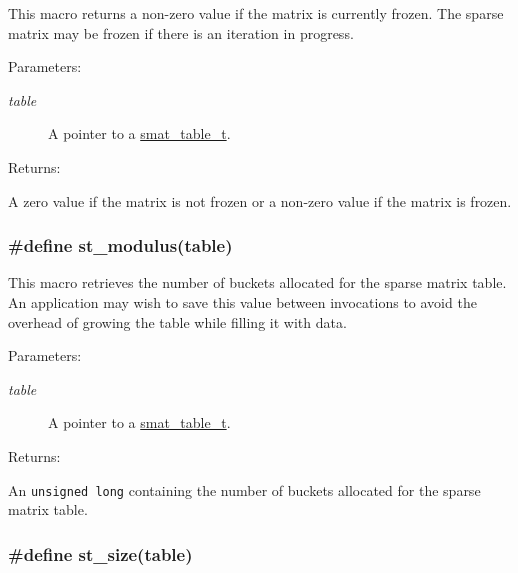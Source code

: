 This macro returns a non-zero value if the matrix is currently frozen. The sparse matrix may be frozen if there is an iteration in progress.\begin{Desc}
\item[Parameters: ]\par
\begin{description}
\item[{\em 
table}]A pointer to a \hyperlink{group__dbprim__smat_a0}{smat\_\-table\_\-t}.\end{description}
\end{Desc}
\begin{Desc}
\item[Returns: ]\par
A zero value if the matrix is not frozen or a non-zero value if the matrix is frozen. \end{Desc}
\hypertarget{group__dbprim__smat_a24}{
\subsubsection[st\_\-modulus]{\setlength{\rightskip}{0pt plus 5cm}\#define st\_\-modulus(table)}}
\label{group__dbprim__smat_a24}


This macro retrieves the number of buckets allocated for the sparse matrix table. An application may wish to save this value between invocations to avoid the overhead of growing the table while filling it with data.\begin{Desc}
\item[Parameters: ]\par
\begin{description}
\item[{\em 
table}]A pointer to a \hyperlink{group__dbprim__smat_a0}{smat\_\-table\_\-t}.\end{description}
\end{Desc}
\begin{Desc}
\item[Returns: ]\par
An {\tt unsigned long} containing the number of buckets allocated for the sparse matrix table. \end{Desc}
\hypertarget{group__dbprim__smat_a27}{
\subsubsection[st\_\-size]{\setlength{\rightskip}{0pt plus 5cm}\#define st\_\-size(table)}}
\label{group__dbprim__smat_a27}


